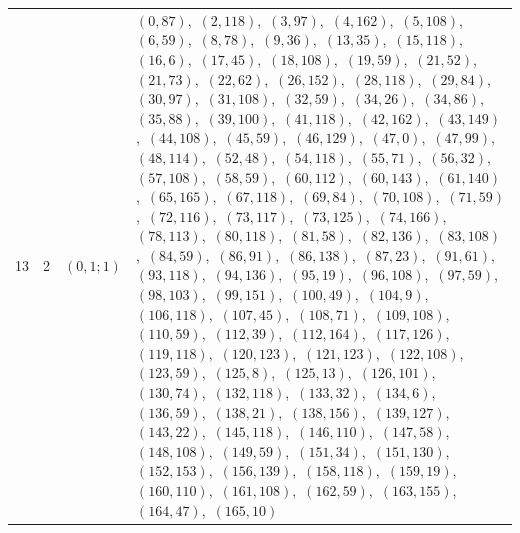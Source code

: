 \documentclass[11pt]{article}
\begin{document}
\begin{longtable}{@{}rrl>{\raggedright\arraybackslash}p{}@{}}
13 & 2 & $(0,1;1)$ & $(0,87)$,\allowbreak\ $(2,118)$,\allowbreak\ $(3,97)$,\allowbreak\ $(4,162)$,\allowbreak\ $(5,108)$,\allowbreak\ $(6,59)$,\allowbreak\ $(8,78)$,\allowbreak\ $(9,36)$,\allowbreak\ $(13,35)$,\allowbreak\ $(15,118)$,\allowbreak\ $(16,6)$,\allowbreak\ $(17,45)$,\allowbreak\ $(18,108)$,\allowbreak\ $(19,59)$,\allowbreak\ $(21,52)$,\allowbreak\ $(21,73)$,\allowbreak\ $(22,62)$,\allowbreak\ $(26,152)$,\allowbreak\ $(28,118)$,\allowbreak\ $(29,84)$,\allowbreak\ $(30,97)$,\allowbreak\ $(31,108)$,\allowbreak\ $(32,59)$,\allowbreak\ $(34,26)$,\allowbreak\ $(34,86)$,\allowbreak\ $(35,88)$,\allowbreak\ $(39,100)$,\allowbreak\ $(41,118)$,\allowbreak\ $(42,162)$,\allowbreak\ $(43,149)$,\allowbreak\ $(44,108)$,\allowbreak\ $(45,59)$,\allowbreak\ $(46,129)$,\allowbreak\ $(47,0)$,\allowbreak\ $(47,99)$,\allowbreak\ $(48,114)$,\allowbreak\ $(52,48)$,\allowbreak\ $(54,118)$,\allowbreak\ $(55,71)$,\allowbreak\ $(56,32)$,\allowbreak\ $(57,108)$,\allowbreak\ $(58,59)$,\allowbreak\ $(60,112)$,\allowbreak\ $(60,143)$,\allowbreak\ $(61,140)$,\allowbreak\ $(65,165)$,\allowbreak\ $(67,118)$,\allowbreak\ $(69,84)$,\allowbreak\ $(70,108)$,\allowbreak\ $(71,59)$,\allowbreak\ $(72,116)$,\allowbreak\ $(73,117)$,\allowbreak\ $(73,125)$,\allowbreak\ $(74,166)$,\allowbreak\ $(78,113)$,\allowbreak\ $(80,118)$,\allowbreak\ $(81,58)$,\allowbreak\ $(82,136)$,\allowbreak\ $(83,108)$,\allowbreak\ $(84,59)$,\allowbreak\ $(86,91)$,\allowbreak\ $(86,138)$,\allowbreak\ $(87,23)$,\allowbreak\ $(91,61)$,\allowbreak\ $(93,118)$,\allowbreak\ $(94,136)$,\allowbreak\ $(95,19)$,\allowbreak\ $(96,108)$,\allowbreak\ $(97,59)$,\allowbreak\ $(98,103)$,\allowbreak\ $(99,151)$,\allowbreak\ $(100,49)$,\allowbreak\ $(104,9)$,\allowbreak\ $(106,118)$,\allowbreak\ $(107,45)$,\allowbreak\ $(108,71)$,\allowbreak\ $(109,108)$,\allowbreak\ $(110,59)$,\allowbreak\ $(112,39)$,\allowbreak\ $(112,164)$,\allowbreak\ $(117,126)$,\allowbreak\ $(119,118)$,\allowbreak\ $(120,123)$,\allowbreak\ $(121,123)$,\allowbreak\ $(122,108)$,\allowbreak\ $(123,59)$,\allowbreak\ $(125,8)$,\allowbreak\ $(125,13)$,\allowbreak\ $(126,101)$,\allowbreak\ $(130,74)$,\allowbreak\ $(132,118)$,\allowbreak\ $(133,32)$,\allowbreak\ $(134,6)$,\allowbreak\ $(136,59)$,\allowbreak\ $(138,21)$,\allowbreak\ $(138,156)$,\allowbreak\ $(139,127)$,\allowbreak\ $(143,22)$,\allowbreak\ $(145,118)$,\allowbreak\ $(146,110)$,\allowbreak\ $(147,58)$,\allowbreak\ $(148,108)$,\allowbreak\ $(149,59)$,\allowbreak\ $(151,34)$,\allowbreak\ $(151,130)$,\allowbreak\ $(152,153)$,\allowbreak\ $(156,139)$,\allowbreak\ $(158,118)$,\allowbreak\ $(159,19)$,\allowbreak\ $(160,110)$,\allowbreak\ $(161,108)$,\allowbreak\ $(162,59)$,\allowbreak\ $(163,155)$,\allowbreak\ $(164,47)$,\allowbreak\ $(165,10)$\\

\end{longtable}
\end{document}
